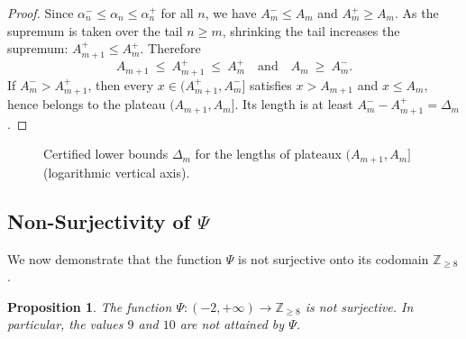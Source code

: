 \documentclass[10pt]{amsart}
\newtheorem{proposition}{Proposition}[section] %
\theoremstyle{definition} %
\numberwithin{equation}{section}
\begin{document}
\begin{proof}
Since \(\alpha_n^-\le \alpha_n\le \alpha_n^+\) for all \(n\), we have
\(A_m^-\le A_m\) and \(A_m^+\ge A_m\). As the supremum is taken over the tail \(n\ge m\),
shrinking the tail increases the supremum: \(A_{m+1}^+\le A_m^+\). Therefore
\[
A_{m+1}\ \le\ A_{m+1}^+\ \le\ A_m^+\quad\text{and}\quad
A_m\ \ge\ A_m^-.
\]
If \(A_m^- > A_{m+1}^+\), then every \(x\in(A_{m+1}^+,A_m^-]\) satisfies
\(x>A_{m+1}\) and \(x\le A_m\), hence belongs to the plateau \((A_{m+1},A_m]\).
Its length is at least \(A_m^- - A_{m+1}^+=\Delta_m\).
\end{proof}


\begin{figure}[h!]
\centering
{}
\caption{Certified lower bounds $\Delta_m$ for the lengths of plateaux $(A_{m+1},A_m]$ (logarithmic vertical axis).}
\end{figure}

\subsection{Non-Surjectivity of $\Psi$}

We now demonstrate that the function $\Psi$ is not surjective onto its codomain $\mathbb{Z}_{\geq 8}$.

\begin{proposition}\label{prop:psi-not-surjective}
The function $\Psi : (-2, +\infty) \to \mathbb{Z}_{\geq 8}$ is not surjective. In particular, the values $9$ and $10$ are not attained by $\Psi$.
\end{proposition}
\end{document}
